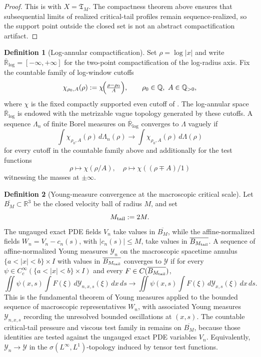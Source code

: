 \documentclass[11pt]{amsart}
\numberwithin{equation}{section}
\theoremstyle{plain}
\theoremstyle{definition}
\newtheorem{definition}[definition]{Definition}
\theoremstyle{remark}
\newcommand{\Tcrit}{\mathfrak T_M}
\begin{document}
\begin{proof}
This is  with \(X=\Tcrit\).  The
compactness theorem above ensures that subsequential limits of realized
critical-tail profiles remain sequence-realized, so the support point outside
the closed set is not an abstract compactification artifact.
\end{proof}

\begin{definition}[Log-annular compactification]
\label{def:log-annular-compactification}
Set \(\rho=\log|x|\) and write \(\overline{\mathbb R}_{\log}=[-\infty,+\infty]\)
for the two-point compactification of the log-radius axis.  Fix the countable
family of log-window cutoffs
\[
   \chi_{\rho_0,A}(\rho):=\chi\!\Bigl(\tfrac{\rho-\rho_0}{A}\Bigr),
   \qquad \rho_0\in\mathbb Q,\ A\in\mathbb Q_{>0},
\]
where \(\chi\) is the fixed compactly supported even cutoff of
.  The log-annular space
\(\overline{\mathbb R}_{\log}\) is endowed with the metrizable vague topology
generated by these cutoffs.  A sequence \(\Lambda_n\) of finite Borel measures
on \(\overline{\mathbb R}_{\log}\) converges to \(\Lambda\) vaguely if
\[
   \int \chi_{\rho_0,A}(\rho)\,d\Lambda_n(\rho)
   \longrightarrow
   \int \chi_{\rho_0,A}(\rho)\,d\Lambda(\rho)
\]
for every cutoff in the countable family above and additionally for the test
functions
\[
   \rho\mapsto \chi(\rho/A),\quad
   \rho\mapsto \chi((\rho\mp A)/1)
\]
witnessing the masses at \(\pm\infty\).
\end{definition}

\begin{definition}[Young-measure convergence at the macroscopic critical scale]
\label{def:young-measure-convergence}
Let \(\overline{B_M}\subset\mathbb R^3\) be the closed velocity ball of radius
\(M\), and set
\[
   M_{\rm tail}:=2M .
\]
The ungauged exact PDE fields \(V_n\) take values in \(\overline{B_M}\), while
the affine-normalized fields \(W_n=V_n-c_n(s)\), with \(|c_n(s)|\le M\), take
values in \(\overline{B_{M_{\rm tail}}}\).  A sequence of affine-normalized Young
measures \(\mathcal Y_n\) on the macroscopic spacetime annulus
\(\{a<|x|<b\}\times I\) with values in \(\overline{B_{M_{\rm tail}}}\)
converges to \(\mathcal Y\) if for every \(\psi\in C_c^\infty(\{a<|x|<b\}\times
I)\) and every \(F\in C(\overline{B_{M_{\rm tail}}})\),
\[
   \iint \psi(x,s)\!\int F(\xi)\,d\mathcal Y_{n,x,s}(\xi)\,dx\,ds
   \longrightarrow
   \iint \psi(x,s)\!\int F(\xi)\,d\mathcal Y_{x,s}(\xi)\,dx\,ds .
\]
This is the fundamental theorem of Young measures applied to the bounded
sequence of macroscopic representatives \(W_n\), with associated Young
measures \(\mathcal Y_{n,x,s}\) recording the unresolved bounded oscillations
at \((x,s)\).  The countable critical-tail pressure and viscous test family in
 remains on
\(\overline{B_M}\), because those identities are tested against the ungauged
exact PDE variables \(V_n\).  Equivalently, \(\mathcal Y_n\to\mathcal Y\) in the
\(\sigma(L^\infty,L^1)\)-topology induced by tensor test functions.
\end{definition}
\end{document}
